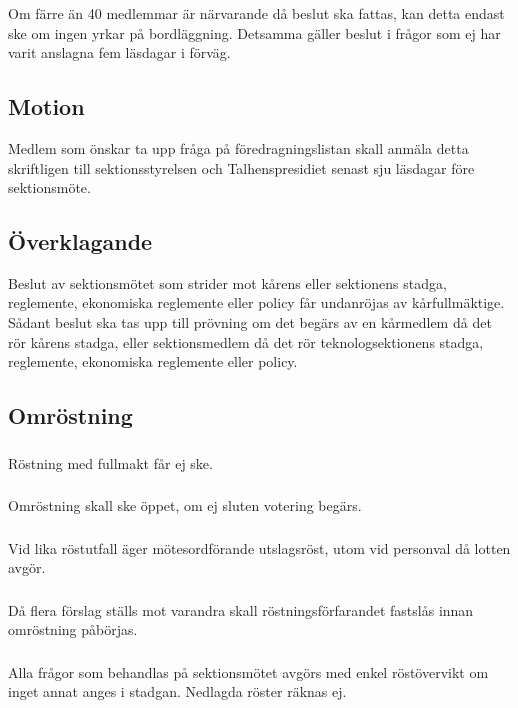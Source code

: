 \documentclass[a4paper]{dtek}
\begin{document}
\subsubsection{}
Om färre än 40 medlemmar är närvarande då beslut ska fattas, kan detta endast ske om ingen yrkar på bordläggning. Detsamma gäller beslut i frågor som ej har varit anslagna fem läsdagar i förväg.
\subsection{Motion}
Medlem som önskar ta upp fråga på föredragningslistan skall anmäla detta skriftligen till sektionsstyrelsen och Talhenspresidiet senast sju läsdagar före sektionsmöte.
\subsection{Överklagande}
Beslut av sektionsmötet som strider mot kårens eller sektionens stadga, reglemente, ekonomiska reglemente eller policy får undanröjas av kårfullmäktige. Sådant beslut ska tas upp till prövning om det begärs av en kårmedlem då det rör kårens stadga, eller sektionsmedlem då det rör teknologsektionens stadga, reglemente, ekonomiska reglemente eller policy.
\subsection{Omröstning}
\subsubsection{}
Röstning med fullmakt får ej ske.
\subsubsection{}
Omröstning skall ske öppet, om ej sluten votering begärs.
\subsubsection{}
Vid lika röstutfall äger mötesordförande utslagsröst, utom vid personval då lotten avgör.
\subsubsection{}
Då flera förslag ställs mot varandra skall röstningsförfarandet fastslås innan omröstning påbörjas.
\subsubsection{}
Alla frågor som behandlas på sektionsmötet avgörs med enkel röstövervikt om inget annat anges i stadgan. Nedlagda röster räknas ej.
\end{document}
